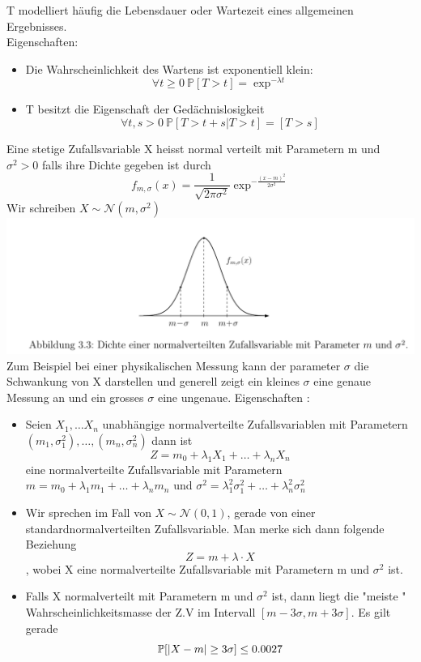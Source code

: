 T modelliert häufig die Lebensdauer oder Wartezeit eines allgemeinen Ergebnisses. \\
Eigenschaften: \begin{itemize}
    \item Die Wahrscheinlichkeit des Wartens ist exponentiell klein: \[ \forall t \geq 0 \ \mathbb{P}[T > t] = \exp^{-\lambda t }\]
    \item T besitzt die Eigenschaft der Gedächnislosigkeit \[ \forall t,s > 0 \ \mathbb{P}[T > t + s | T > t] = [T > s]\]
\end{itemize}

\Def[3.29] \newline
Eine stetige Zufallsvariable X heisst normal verteilt mit Parametern m und \( \sigma^2 > 0\) falls ihre Dichte gegeben ist durch \[ f_{m,\sigma}(x) = \frac{1}{\sqrt{2 \pi \sigma^2}}\exp^{-\frac{(x-m)^2}{2 \sigma^2}}\]
Wir schreiben \( X \sim \mathcal{N}(m, \sigma^2)\) \newline
\Bem[3.29A] \newline
\includegraphics[scale=0.175]{Dichte_Normalverteilung.png} \\
Zum Beispiel bei einer physikalischen Messung kann der parameter \( \sigma\) die Schwankung von X darstellen und generell zeigt ein kleines \(\sigma\) eine genaue Messung an und ein grosses \(\sigma\) eine ungenaue.
Eigenschaften : \begin{itemize}
    \item Seien \(X_1, \dots X_n\) unabhängige normalverteilte Zufallsvariablen mit Parametern \((m_1, \sigma_1^2), \dots , (m_n, \sigma_n^2)\) dann ist \[ Z = m_0 + \lambda_1 X_1 + \dots + \lambda_n X_n \] eine normalverteilte Zufallsvariable mit Parametern \(m = m_0 + \lambda_1 m_1 + \dots + \lambda_n m_n\) und \(\sigma^2 = \lambda_1^2 \sigma_1^2 + \dots + \lambda_n^2 \sigma_n^2\)
    \item Wir sprechen im Fall von  \( X \sim \mathcal{N}(0,1)\), gerade von einer standardnormalverteilten Zufallsvariable. Man merke sich dann folgende Beziehung \[ Z = m + \lambda \cdot X\], wobei X eine normalverteilte Zufallsvariable mit Parametern m und \(\sigma^2\) ist.
    \item Falls X normalverteilt mit Parametern m und \( \sigma^2 \) ist, dann liegt die "meiste " Wahrscheinlichkeitsmasse der Z.V im Intervall \( [m - 3\sigma, m + 3\sigma ]\). Es gilt gerade \[ \mathbb{P}[\left\lvert X - m \right\rvert \geq 3 \sigma ] \leq 0.0027\]
\end{itemize}

